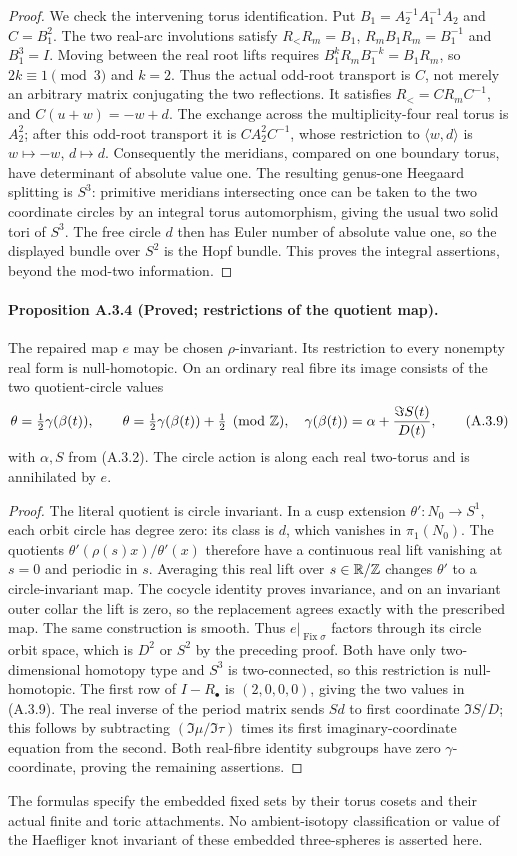 \begin{proof}
We check the intervening torus identification. Put
$B_1=A_2^{-1}A_1^{-1}A_2$ and $C=B_1^2$. The two real-arc involutions
satisfy $R_<R_m=B_1$, $R_mB_1R_m=B_1^{-1}$ and $B_1^3=I$.
Moving between the real root lifts requires
$B_1^kR_mB_1^{-k}=B_1R_m$, so $2k\equiv1\pmod3$ and $k=2$.
Thus the actual odd-root transport is $C$, not merely an arbitrary
matrix conjugating the two reflections. It satisfies $R_<=CR_mC^{-1}$, and
$C(u+w)=-w+d$. The exchange across the multiplicity-four real torus
is $A_2^2$; after this odd-root transport it is
$CA_2^2C^{-1}$, whose restriction to $\langle w,d\rangle$ is
$w\mapsto-w$, $d\mapsto d$. Consequently the meridians, compared on
one boundary torus, have determinant of absolute value one. The
resulting genus-one Heegaard splitting is $S^3$: primitive meridians
intersecting once can be taken to the two coordinate circles by an
integral torus automorphism, giving the usual two solid tori of $S^3$.
The free circle $d$ then has Euler number of absolute value one, so
the displayed bundle over $S^2$ is the Hopf bundle. This proves the
integral assertions, beyond the mod-two information.
\end{proof}

\paragraph{Proposition A.3.4 (Proved; restrictions of the quotient map).}
The repaired map $e$ may be chosen $\rho$-invariant. Its restriction to
every nonempty real form is null-homotopic. On an ordinary real fibre
its image consists of the two quotient-circle values
\[
 \theta=\tfrac12\gamma(\beta(t)),\qquad
 \theta=\tfrac12\gamma(\beta(t))+\tfrac12\pmod{\mathbb Z},
 \quad
 \gamma(\beta(t))=\alpha+\frac{\Im S(t)}{D(t)},
 \tag{A.3.9}
\]
with $\alpha,S$ from (A.3.2). The circle action is along each real
two-torus and is annihilated by $e$.

\begin{proof}
The literal quotient is circle invariant. In a cusp extension
$\theta':N_0\to S^1$, each orbit circle has degree zero: its class is
$d$, which vanishes in $\pi_1(N_0)$. The quotients
$\theta'(\rho(s)x)/\theta'(x)$ therefore have a continuous real lift
vanishing at $s=0$ and periodic in $s$. Averaging this real lift over
$s\in\mathbb R/\mathbb Z$ changes $\theta'$ to a circle-invariant map. The cocycle
identity proves invariance, and on an invariant outer collar the lift
is zero, so the replacement agrees exactly with the prescribed map.
The same construction is smooth. Thus $e|_{\operatorname{Fix}\sigma}$
factors through its circle orbit space, which is $D^2$ or $S^2$ by the
preceding proof. Both have only two-dimensional homotopy type and
$S^3$ is two-connected, so this restriction is null-homotopic.
The first row of $I-R_\bullet$ is $(2,0,0,0)$, giving the two values
in (A.3.9). The real inverse of the period matrix sends $S d$ to
first coordinate $\Im S/D$; this follows by subtracting
$(\Im\mu/\Im\tau)$ times its first imaginary-coordinate equation
from the second. Both real-fibre identity subgroups have zero
$\gamma$-coordinate, proving the remaining assertions.
\end{proof}

The formulas specify the embedded fixed sets by their torus cosets and
their actual finite and toric attachments. No ambient-isotopy
classification or value of the Haefliger knot invariant of these
embedded three-spheres is asserted here.
